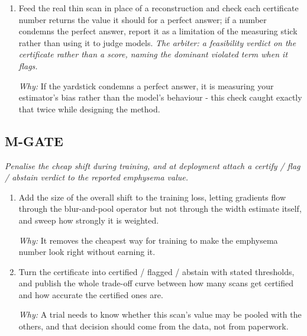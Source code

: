 \documentclass[10pt,a4paper]{article}
\begin{document}
\begin{enumerate}[leftmargin=*,start=3]
\par\emph{Why:} The overall shift is the part that fakes a good emphysema number, and it is the one part that can be read off no matter which averaging width was estimated.
  \item Feed the real thin scan in place of a reconstruction and check each certificate number returns the value it should for a perfect answer;\allowbreak{} if a number condemns the perfect answer, report it as a limitation of the measuring stick rather than using it to judge models.
\noindent\emph{The arbiter: a feasibility verdict on the certificate rather than a score, naming the dominant violated term when it flags.}
\par{}
\par\emph{Why:} If the yardstick condemns a perfect answer, it is measuring your estimator's bias rather than the model's behaviour - this check caught exactly that twice while designing the method.
\end{enumerate}
\subsection*{M-GATE}
\emph{Penalise the cheap shift during training, and at deployment attach a certify / flag / abstain verdict to the reported emphysema value.}
\begin{enumerate}[leftmargin=*,start=6]
  \item Add the size of the overall shift to the training loss, letting gradients flow through the blur-and-pool operator but not through the width estimate itself, and sweep how strongly it is weighted.
\par\emph{Why:} It removes the cheapest way for training to make the emphysema number look right without earning it.
  \item Turn the certificate into certified / flagged / abstain with stated thresholds, and publish the whole trade-off curve between how many scans get certified and how accurate the certified ones are.
\par\emph{Why:} A trial needs to know whether this scan's value may be pooled with the others, and that decision should come from the data, not from paperwork.
\end{enumerate}
\end{document}

